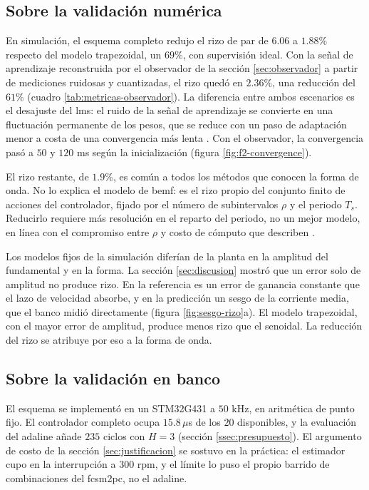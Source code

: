 \documentclass[../../../Tesis_JALS_Maestria.tex]{subfiles}
\begin{document}
\subsection{Sobre la validación numérica}

En simulación, el esquema completo redujo el rizo de par de $6.06$ a $1.88\%$ respecto del modelo trapezoidal, un $69\%$, con supervisión ideal. Con la señal de aprendizaje reconstruida por el observador de la sección \ref{sec:observador} a partir de mediciones ruidosas y cuantizadas, el rizo quedó en $2.36\%$, una reducción del $61\%$ (cuadro \ref{tab:metricas-observador}). La diferencia entre ambos escenarios es el desajuste del \acrshort{lms}: el ruido de la señal de aprendizaje se convierte en una fluctuación permanente de los pesos, que se reduce con un paso de adaptación menor a costa de una convergencia más lenta \citep{haykin2014adaptive}. Con el observador, la convergencia pasó a $50$ y $120$ ms según la inicialización (figura \ref{fig:f2-convergence}).

El rizo restante, de $1.9\%$, es común a todos los métodos que conocen la forma de onda. No lo explica el modelo de \acrshort{bemf}: es el rizo propio del conjunto finito de acciones del controlador, fijado por el número de subintervalos $\rho$ y el periodo $T_s$. Reducirlo requiere más resolución en el reparto del periodo, no un mejor modelo, en línea con el compromiso entre $\rho$ y costo de cómputo que describen \citet{coronado2025}.

Los modelos fijos de la simulación diferían de la planta en la amplitud del fundamental y en la forma. La sección \ref{sec:discusion} mostró que un error solo de amplitud no produce rizo. En la referencia es un error de ganancia constante que el lazo de velocidad absorbe, y en la predicción un sesgo de la corriente media, que el banco midió directamente (figura \ref{fig:sesgo-rizo}a). El modelo trapezoidal, con el mayor error de amplitud, produce menos rizo que el senoidal. La reducción del rizo se atribuye por eso a la forma de onda.

\subsection{Sobre la validación en banco}

El esquema se implementó en un STM32G431 a $50$ kHz, en aritmética de punto fijo. El controlador completo ocupa $15.8\,\mu$s de los $20$ disponibles, y la evaluación del \acrshort{adaline} añade $235$ ciclos con $H = 3$ (sección \ref{ssec:presupuesto}). El argumento de costo de la sección \ref{sec:justificacion} se sostuvo en la práctica: el estimador cupo en la interrupción a $300$ rpm, y el límite lo puso el propio barrido de combinaciones del \acrshort{fcsm2pc}, no el \acrshort{adaline}.
\end{document}
